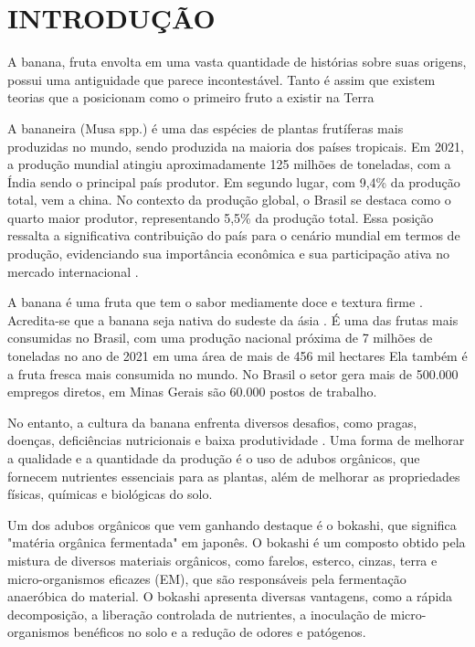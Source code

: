 \chapter{INTRODUÇÃO}

A banana, fruta envolta em uma vasta quantidade de histórias sobre suas origens, possui uma antiguidade que parece incontestável. Tanto é assim que existem teorias que a posicionam como o primeiro fruto a existir na Terra

A bananeira (Musa spp.) é uma das espécies de plantas frutíferas mais produzidas no mundo, sendo produzida na maioria dos países tropicais. Em 2021, a produção mundial atingiu aproximadamente 125 milhões de toneladas, com a Índia sendo o principal país produtor. Em segundo lugar, com 9,4\% da produção total, vem a china. No contexto da produção global, o Brasil se destaca como o quarto maior produtor, representando 5,5\% da produção total. Essa posição ressalta a significativa contribuição do país para o cenário mundial em termos de produção, evidenciando sua importância econômica e sua participação ativa no mercado internacional \cite{banana}. 

A banana é uma fruta que tem o sabor mediamente doce e textura firme \cite{MATSUURA2004}. Acredita-se que a banana seja nativa do sudeste da ásia \cite{1956TaOo}. É uma das frutas mais consumidas no Brasil, com uma produção nacional próxima de 7 milhões de toneladas no ano de 2021 em uma área de mais de 456 mil hectares \cite{banana} Ela também é a fruta fresca mais consumida no mundo. No Brasil o setor gera mais de 500.000 empregos diretos, em Minas Gerais são 60.000 postos de trabalho.

No entanto, a cultura da banana enfrenta diversos desafios, como pragas, doenças, deficiências nutricionais e baixa produtividade \cite{nogueira2013bananicultura}. Uma forma de melhorar a qualidade e a quantidade da produção é o uso de adubos orgânicos, que fornecem nutrientes essenciais para as plantas, além de melhorar as propriedades físicas, químicas e biológicas do solo.

Um dos adubos orgânicos que vem ganhando destaque é o bokashi, que significa "matéria orgânica fermentada" em japonês. O bokashi é um composto obtido pela mistura de diversos materiais orgânicos, como farelos, esterco, cinzas, terra e micro-organismos eficazes (EM), que são responsáveis pela fermentação anaeróbica do material. O bokashi apresenta diversas vantagens, como a rápida decomposição, a liberação controlada de nutrientes, a inoculação de micro-organismos benéficos no solo e a redução de odores e patógenos.

